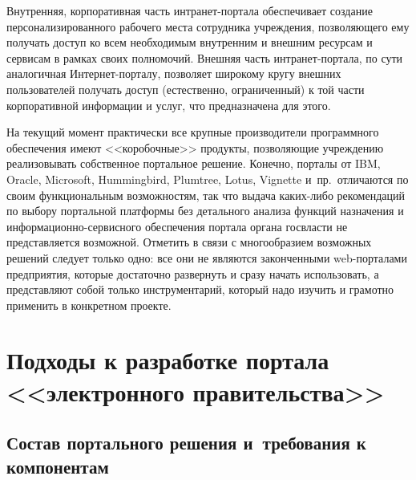 \begin{multicols}{2}
Внутренняя, корпоративная часть интранет-портала обеспечивает создание
персонализированного рабочего места сотрудника учреждения, позволяющего ему
получать доступ ко всем необходимым внутренним и внешним ресурсам и сервисам в
рамках своих полномочий. Внешняя часть интранет-портала, по сути аналогичная
Интернет-порталу, позволяет широкому кругу внешних пользователей получать доступ
(естественно, ограниченный) к той части корпоративной информации и услуг, что
предназначена для этого.

На текущий момент практически все крупные производители программного обеспечения
имеют <<коробочные>> продукты, позволяющие учреждению реализовывать собственное
портальное решение. Конечно, порталы от IBM, Oracle, Microsoft, Hummingbird, Plumtree,
Lotus, Vignette и~пр.\ отличаются по своим функциональным воз\-мож\-ностям, так что
выдача каких-либо рекомендаций по выбору портальной платформы без детального
анализа функций назначения и информационно-сер\-вис\-но\-го обеспечения портала органа
госвласти не представляется возможной. Отметить в связи с многообразием возможных
решений следует только одно: все они не являются законченными web-порталами
предприятия, которые достаточно развернуть и сразу начать использовать, а представляют
собой только инструментарий, который надо изучить и грамотно применить в конкретном
проекте.

\section{Подходы к разработке портала <<электронного правительства>>} %

\subsection{Состав портального решения и~требования к компонентам} %


\end{multicols}
